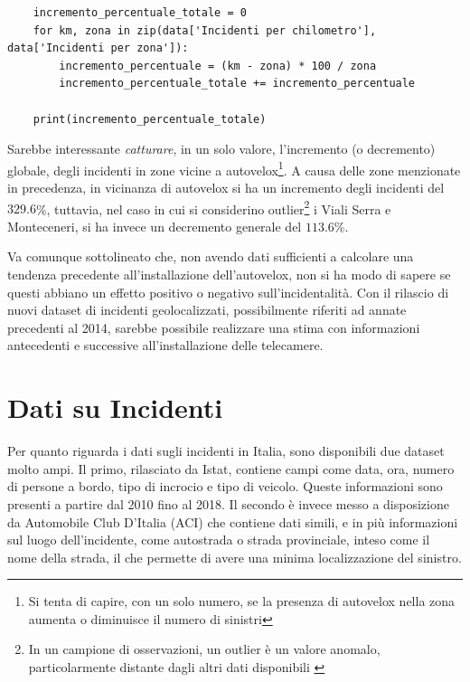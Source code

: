 \documentclass[a4paper,12pt]{report}
\newcommand{\quotestyle}[1]{\textit{#1}}
\begin{document}
\begin{lstlisting}
    incremento_percentuale_totale = 0
    for km, zona in zip(data['Incidenti per chilometro'], data['Incidenti per zona']): 
        incremento_percentuale = (km - zona) * 100 / zona
        incremento_percentuale_totale += incremento_percentuale

    print(incremento_percentuale_totale)
\end{lstlisting}

Sarebbe interessante \quotestyle{catturare}, in un solo valore, l'incremento (o decremento) 
globale, degli incidenti in zone vicine a 
autovelox\footnote{Si tenta di capire, con un solo numero, se la presenza di autovelox nella zona 
aumenta o diminuisce il numero di sinistri}.
A causa delle zone menzionate in precedenza, in vicinanza di autovelox si ha un incremento degli 
incidenti del $329.6$\%, tuttavia, nel caso in cui si considerino 
outlier\footnote{In un campione di osservazioni, un outlier è un valore anomalo, 
particolarmente distante dagli altri dati disponibili \cite{PROB_E_STATISTICA:1}} 
i Viali Serra e Monteceneri, si ha invece un decremento generale del $113.6$\%.

Va comunque sottolineato che, non avendo dati sufficienti a calcolare una tendenza 
precedente all'installazione dell'autovelox, non si ha modo di sapere se questi abbiano un 
effetto positivo o negativo sull'incidentalità.
Con il rilascio di nuovi dataset di incidenti geolocalizzati, possibilmente riferiti ad annate 
precedenti al 2014, sarebbe possibile realizzare una stima con informazioni antecedenti e 
successive all'installazione delle telecamere.


\chapter{Dati su Incidenti}

Per quanto riguarda i dati sugli incidenti in Italia, sono disponibili due dataset 
molto ampi. 
Il primo, rilasciato da Istat, contiene campi come data, ora, 
numero di persone a bordo, tipo di incrocio e tipo di veicolo.
Queste informazioni sono presenti a partire dal 2010 fino al 2018.
Il secondo è invece messo a disposizione da Automobile Club D'Italia (ACI) che contiene dati simili, 
e in più informazioni sul luogo dell'incidente, come autostrada o strada provinciale, 
inteso come il nome della strada, il che permette di avere una minima localizzazione del 
sinistro.
\end{document}
